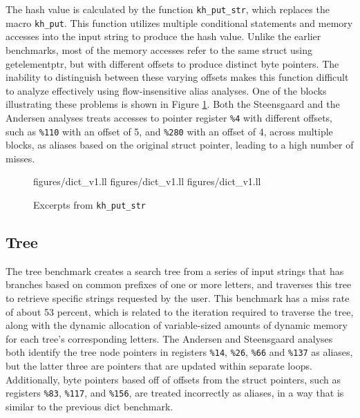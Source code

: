 The hash value is calculated by the function \texttt{kh\_put\_str}, which replaces the macro \texttt{kh\_put}. This function utilizes multiple conditional statements and memory accesses into the input string to produce the hash value. Unlike the earlier benchmarks, most of the memory accesses refer to the same struct using getelementptr, but with different offsets to produce distinct byte pointers. The inability to distinguish between these varying offsets makes this function difficult to analyze effectively using flow-insensitive alias analyses. One of the blocks illustrating these problems is shown in Figure \ref{fig:dictll2}. Both the Steensgaard and the Andersen analyses treats accesses to pointer register \texttt{\%4} with different offsets, such as \texttt{\%110} with an offset of 5, and \texttt{\%280} with an offset of 4, across multiple blocks, as aliases based on the original struct pointer, leading to a high number of misses.

\begin{figure} [h!]
   {figures/dict_v1.ll}
   {figures/dict_v1.ll}
   {figures/dict_v1.ll}
  \caption{Excerpts from \texttt{kh\_put\_str}}
  \label{fig:dictll2}
\end{figure}

\subsection{Tree}
The tree benchmark creates a search tree from a series of input strings that has branches based on common prefixes of one or more letters, and traverses this tree to retrieve specific strings requested by the user. This benchmark has a miss rate of about 53 percent, which is related to the iteration required to traverse the tree, along with the dynamic allocation of variable-sized amounts of dynamic memory for each tree's corresponding letters. The Andersen and Steensgaard analyses both identify the tree node pointers in registers \texttt{\%14}, \texttt{\%26}, \texttt{\%66} and \texttt{\%137} as aliases, but the latter three are pointers that are updated within separate loops. Additionally, byte pointers based off of offsets from the struct pointers, such as registers \texttt{\%83}, \texttt{\%117}, and \texttt{\%156}, are treated incorrectly as aliases, in a way that is similar to the previous dict benchmark.

